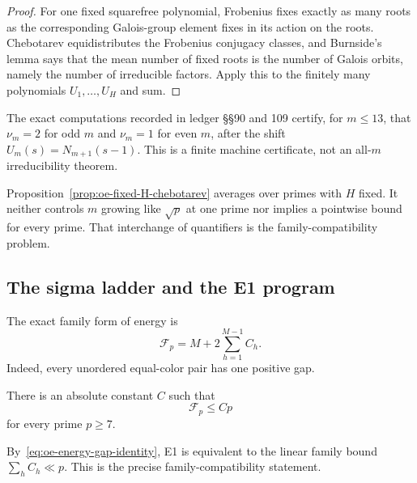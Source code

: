 \begin{proof}
For one fixed squarefree polynomial, Frobenius fixes exactly as many roots
as the corresponding Galois-group element fixes in its action on the roots.
Chebotarev equidistributes the Frobenius conjugacy classes, and Burnside's
lemma says that the mean number of fixed roots is the number of Galois
orbits, namely the number of irreducible factors.  Apply this to the finitely
many polynomials $U_1,\ldots,U_H$ and sum.
\end{proof}

\begin{remark}\label{rem:oe-factor-certificate}
The exact computations recorded in ledger §§90 and 109 certify, for
$m\le13$, that $\nu_m=2$ for odd $m$ and $\nu_m=1$ for even $m$, after the
shift $U_m(s)=N_{m+1}(s-1)$.  This is a finite machine certificate, not an
all-$m$ irreducibility theorem.
\end{remark}

\begin{remark}\label{rem:oe-chebotarev-limitation}
Proposition~\ref{prop:oe-fixed-H-chebotarev} averages over primes with $H$
fixed.  It neither controls $m$ growing like $\sqrt p$ at one prime nor
implies a pointwise bound for every prime.  That interchange of quantifiers
is the family-compatibility problem.
\end{remark}

\subsection{The sigma ladder and the E1 program}

The exact family form of energy is
\begin{equation}\label{eq:oe-energy-gap-identity}
 \mathcal F_p=M+2\sum_{h=1}^{M-1}C_h.
\end{equation}
Indeed, every unordered equal-color pair has one positive gap.

\begin{conjecture}\label{conj:oe-E1}
There is an absolute constant $C$ such that
\[
 \mathcal F_p\le Cp
\]
for every prime $p\ge7$.
\end{conjecture}

By~\eqref{eq:oe-energy-gap-identity}, E1 is equivalent to the linear family
bound $\sum_hC_h\ll p$.  This is the precise family-compatibility statement.

